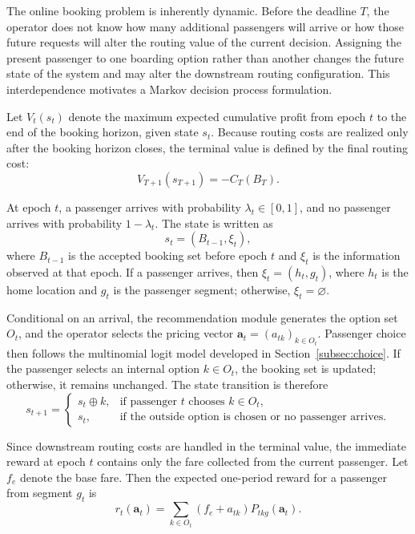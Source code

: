 \documentclass[preprint,12pt,authoryear]{elsarticle}
\begin{document}
The online booking problem is inherently dynamic. Before the deadline $T$, the operator does not know how many additional passengers will arrive or how those future requests will alter the routing value of the current decision. Assigning the present passenger to one boarding option rather than another changes the future state of the system and may alter the downstream routing configuration. This interdependence motivates a Markov decision process formulation.

Let $V_t(s_t)$ denote the maximum expected cumulative profit from epoch $t$ to the end of the booking horizon, given state $s_t$. Because routing costs are realized only after the booking horizon closes, the terminal value is defined by the final routing cost:
\begin{equation}
V_{T+1}(s_{T+1}) = - C_T(B_T).
\tag{3}\label{eq:terminal}
\end{equation}

At epoch $t$, a passenger arrives with probability $\lambda_t \in [0,1]$, and no passenger arrives with probability $1-\lambda_t$. The state is written as
\begin{equation}
s_t = (B_{t-1},\xi_t),
\tag{4}\label{eq:state}
\end{equation}
where $B_{t-1}$ is the accepted booking set before epoch $t$ and $\xi_t$ is the information observed at that epoch. If a passenger arrives, then $\xi_t = (h_t,g_t)$, where $h_t$ is the home location and $g_t$ is the passenger segment; otherwise, $\xi_t=\varnothing$.

Conditional on an arrival, the recommendation module generates the option set $O_t$, and the operator selects the pricing vector $\mathbf{a}_t=(a_{tk})_{k\in O_t}$. Passenger choice then follows the multinomial logit model developed in Section~\ref{subsec:choice}. If the passenger selects an internal option $k\in O_t$, the booking set is updated; otherwise, it remains unchanged. The state transition is therefore
\begin{equation}
s_{t+1} =
\begin{cases}
s_t \oplus k, & \text{if passenger } t \text{ chooses } k \in O_t,\\
s_t, & \text{if the outside option is chosen or no passenger arrives.}
\end{cases}
\tag{5}\label{eq:transition}
\end{equation}

Since downstream routing costs are handled in the terminal value, the immediate reward at epoch $t$ contains only the fare collected from the current passenger. Let $f_e$ denote the base fare. Then the expected one-period reward for a passenger from segment $g_t$ is
\begin{equation}
r_t(\mathbf{a}_t) = \sum_{k\in O_t}(f_e+a_{tk})P_{tkg}(\mathbf{a}_t).
\tag{6}\label{eq:reward}
\end{equation}
\end{document}
